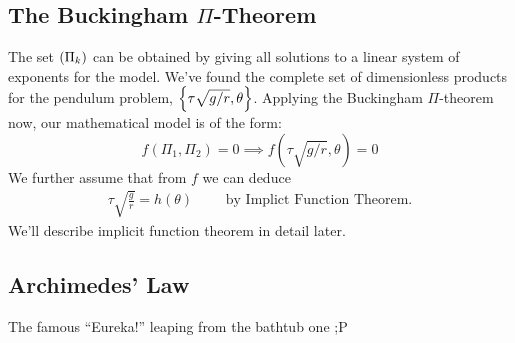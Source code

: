 \documentclass{report}
\begin{document}
\subsection*{The Buckingham $\Pi$-Theorem}


The set $\left( \Pi_k \right)$ can be obtained by giving all solutions to a linear system of exponents for the model. We've found the complete set of dimensionless products for the pendulum problem, $\left\lbrace \tau\sqrt{g/r}, \theta \right\rbrace$. Applying the Buckingham $\Pi$-theorem now, our mathematical model is of the form:
$$
	f(\Pi_1, \Pi_2) = 0 \implies f(\tau\sqrt{g/r}, \theta) = 0
$$
We further assume that from $f$ we can deduce 
\begin{gather*}
	\tau\sqrt{\frac{g}{r}} = h(\theta)\qquad \text{ by Implict Function Theorem.}
\end{gather*}
We'll describe implicit function theorem in detail later.


\subsection*{Archimedes' Law}
The famous ``Eureka!'' leaping from the bathtub one ;P\\
\end{document}

